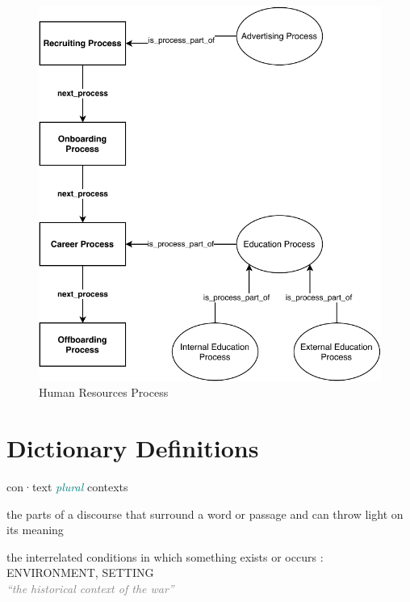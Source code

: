 \documentclass[a4paper, DIV=13, BCOR=0cm]{scrbook}
\begin{document}
\begin{figure}[h]
	\caption{Human Resources Process}
	\centering
	\includegraphics[width=1\textwidth]{Diagrams/hr-process.pdf}
\end{figure}
\clearpage

\section{Dictionary Definitions}
\label{dictionary}
\begin{mdframed}[style=dictionary, frametitle={context {\scriptsize\normalfont\textsc{noun \hfill Merriam-Webster}}}]{
	\small con·​text \textit{\textcolor{teal}{plural}} contexts
		\begin{compactenum}
			\item the parts of a discourse that surround a word or passage and can throw light on its meaning
			\item the interrelated conditions in which something exists or occurs : ENVIRONMENT, SETTING \\
			\textcolor{gray}{\textit{\enquote{the historical context of the war}}}
		\end{compactenum}
	}
\end{mdframed}
\end{document}
